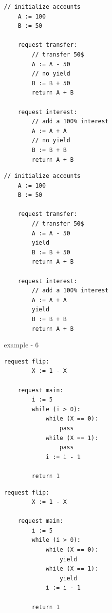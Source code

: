 \noindent
\begin{minipage}[t]{0.45\textwidth}
	\begin{lstlisting}[caption={bank (serializable)}]
    // initialize accounts
    A := 100
    B := 50
    
    request transfer: 
        // transfer 50$
        A := A - 50
        // no yield
        B := B + 50
        return A + B
			
    request interest: 
        // add a 100% interest
        A := A + A
        // no yield
        B := B + B
        return A + B	      		        
		\end{lstlisting}
\end{minipage}
\hfill
\begin{minipage}[t]{0.45\textwidth}
	\begin{lstlisting}[caption={bank with yields (non serializable)}]
    // initialize accounts
    A := 100
    B := 50
		
    request transfer: 
        // transfer 50$
        A := A - 50
        yield
        B := B + 50
        return A + B

    request interest: 
        // add a 100% interest
        A := A + A
        yield
        B := B + B
        return A + B	      		        
	\end{lstlisting}
\end{minipage}
	


example - 6


\noindent
\begin{minipage}[t]{0.45\textwidth}
	\begin{lstlisting}[caption={Complex while (serializable)}]
    request flip: 
        X := 1 - X 
    
    request main:
        i := 5
        while (i > 0):
            while (X == 0):
                pass
            while (X == 1):
                pass
            i := i - 1
        
        return 1       
		\end{lstlisting}
\end{minipage}%
\hfill
\begin{minipage}[t]{0.45\textwidth}
	\begin{lstlisting}[caption={Complex while with yields (not serializable)}]
    request flip: 
        X := 1 - X 

    request main:
        i := 5
        while (i > 0):
            while (X == 0):
                yield
            while (X == 1):
                yield
            i := i - 1

        return 1        
			\end{lstlisting}
\end{minipage}



